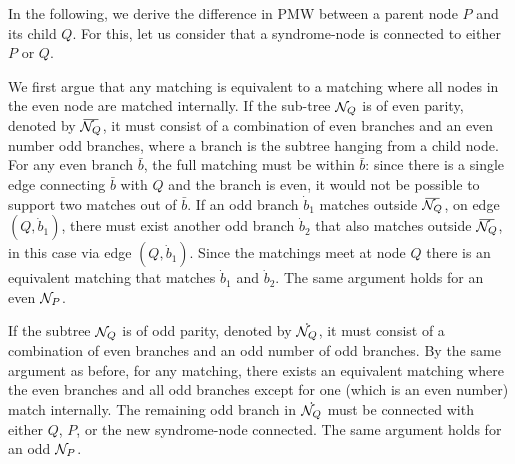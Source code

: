 In the following, we derive the difference in PMW between a parent node $P$ and its child $Q$. For this, let us consider that a syndrome-node is connected to either $P$ or $Q$. 

We first argue that any matching is equivalent to a matching where all nodes in the even node are matched internally. If the sub-tree $\mathcal{N}_Q$ is of even parity, denoted by $\overbar{\nset_Q}$, it must consist of a combination of even branches and an even number odd branches, where a branch is the subtree hanging from a child node. %
For any even branch $\bar{b}$, the full matching must be within $\bar{b}$: since there is a single edge connecting $\bar b$ with $Q$ and the branch is even, it would not be possible to support two matches out of $\bar{b}$. 
If an odd branch $\dot{b}_1$ matches outside $\overbar{\nset_Q}$, on edge $(Q, \dot{b}_1)$, there must exist another odd branch $\dot{b}_2$ that also matches outside $\overbar{\nset_Q}$, in this case via edge $(Q, \dot{b}_1)$. Since the matchings meet at node $Q$ there is an equivalent matching that matches $\dot{b}_1$ and $\dot{b}_2$. 
The same argument holds for an even $\mathcal{N}_P$.

If the subtree $\mathcal{N}_Q$ is of odd parity, denoted by $\dot{\mathcal{N}_Q}$, it must consist of a combination of even branches and an odd number of odd branches. By the same argument as before, for any matching, there exists an equivalent matching where the even branches and all odd branches except for one (which is an even number) match internally. 
The remaining odd branch in $\dot{\mathcal{N}_Q}$ must be connected with either $Q$, $P$, or the new syndrome-node connected. The same argument holds for an odd $\mathcal{N}_P$.


